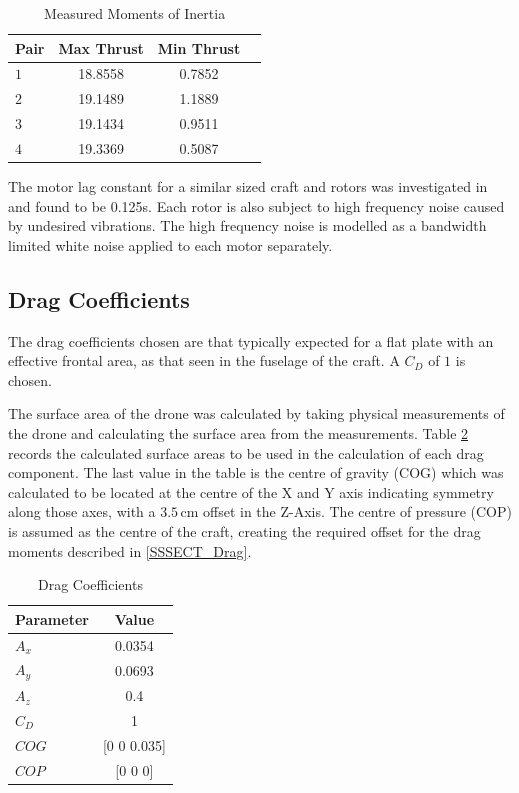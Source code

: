 	\begin{table}[H]
		\centering
		\begin{tabular}{l | c | c | c |}
			Pair & Max Thrust & Min Thrust\\
			\hline\hline
			$1$ & 18.8558 & 0.7852\\
			$2$ & 19.1489 & 1.1889\\
			$3$ & 19.1434 & 0.9511\\
			$4$ & 19.3369 & 0.5087\\
		\end{tabular}
		\caption{Measured Moments of Inertia}
		\label{tab:ThrustProfiles}
	\end{table}
	
	The motor lag constant for a similar sized craft and rotors was investigated in \cite{Moller2015} and found to be 0.125s. Each rotor is also subject to high frequency noise caused by undesired vibrations. The high frequency noise is modelled as a bandwidth limited white noise applied to each motor separately. 
	
	\subsection{Drag Coefficients}
	The drag coefficients chosen are that typically expected for a flat plate with an effective frontal area, as that seen in the fuselage of the craft. A $C_D$ of $1$ is chosen.
	
	The surface area of the drone was calculated by taking physical measurements of the drone and calculating the surface area from the measurements. Table \ref{tab:DragCoeff} records the calculated surface areas to be used in the calculation of each drag component. The last value in the table is the centre of gravity (COG) which was calculated to be located at the centre of the X and Y axis indicating symmetry along those axes, with a $3.5$\,cm offset in the Z-Axis. The centre of pressure (COP) is assumed as the centre of the craft, creating the required offset for the drag moments described in \ref{SSSECT_Drag}.
	
	\begin{table}[H]
		\centering
		\begin{tabular}{l | c |}
			Parameter & Value\\
			\hline\hline
			$A_x$ & 0.0354\\
			$A_y$ & 0.0693\\
			$A_z$ & 0.4\\
			$C_D$ & 1\\
			$COG$ & [0 0 0.035]\\
			$COP$ & [0 0 0]\\
		\end{tabular}
		\caption{Drag Coefficients}
		\label{tab:DragCoeff}
	\end{table}
	 
